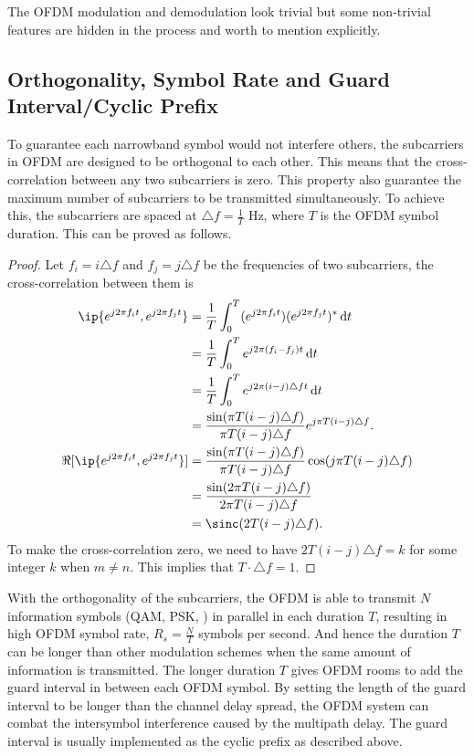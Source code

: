 The OFDM modulation and demodulation look trivial but some non-trivial features are hidden in the process and worth to mention explicitly.

\subsection{Orthogonality, Symbol Rate and Guard Interval/Cyclic Prefix}
To guarantee each narrowband symbol would not interfere others, the subcarriers in OFDM are designed to be orthogonal to each other. This means that the cross-correlation between any two subcarriers is zero. This property also guarantee the maximum number of subcarriers to be transmitted simultaneously. To achieve this, the subcarriers are spaced at $\triangle f=\frac{1}{T}$ Hz, where $T$ is the OFDM symbol duration. This can be proved as follows.
\begin{proof}
    Let $f_i=i\triangle f$ and $f_j=j\triangle f$ be the frequencies of two subcarriers, the cross-correlation between them is
    \begin{align*}
        \ip{e^{j2\pi f_i t}, e^{j2\pi f_j t}}
        &= \frac{1}{T}\int_{0}^{T} (e^{j2\pi f_i t}) (e^{j2\pi f_j t})^* \diff t \\
        &= \frac{1}{T}\int_{0}^{T} e^{j2\pi (f_i - f_j) t} \diff t \\
        &= \frac{1}{T}\int_{0}^{T} e^{j2\pi (i - j)\triangle f t} \diff t \\
        &= \frac{\sin(\pi T(i-j)\triangle f)}{\pi T(i-j)\triangle f}e^{j\pi T(i-j)\triangle f}. \\
        \Re[\ip{e^{j2\pi f_i t}, e^{j2\pi f_j t}}]
        &= \frac{\sin(\pi T(i-j)\triangle f)}{\pi T(i-j)\triangle f}\cos(j\pi T(i-j)\triangle f) \\
        &= \frac{\sin(2\pi T(i-j)\triangle f)}{2\pi T(i-j)\triangle f} \\
        &= \sinc(2T(i-j)\triangle f).
    \end{align*}
    To make the cross-correlation zero, we need to have $2T(i-j)\triangle f = k$ for some integer $k$ when $m\neq n$. This implies that $T\cdot\triangle f=1$.
\end{proof}
With the orthogonality of the subcarriers, the OFDM is able to transmit $N$ information symbols (\ie QAM, PSK, \etc) in parallel in each duration $T$, resulting in high OFDM symbol rate, $R_s=\frac{N}{T}$ symbols per second. And hence the duration $T$ can be longer than other modulation schemes when the same amount of information is transmitted.
The longer duration $T$ gives OFDM rooms to add the guard interval in between each OFDM symbol. By setting the length of the guard interval to be longer than the channel delay spread, the OFDM system can combat the intersymbol interference caused by the multipath delay. The guard interval is usually implemented as the cyclic prefix as described above.


